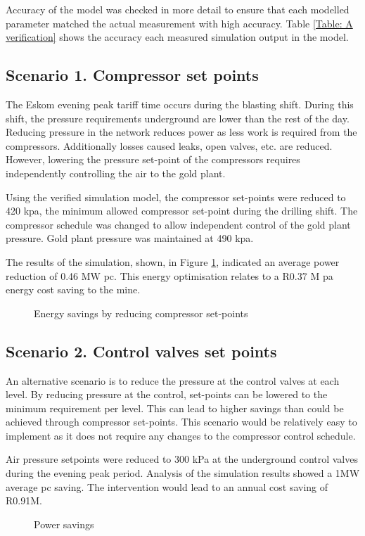 \par
Accuracy of the model was checked in more detail to ensure that each modelled parameter matched the actual measurement with high accuracy. Table \ref{Table: A verification} shows the accuracy each measured simulation output in the model.
\clearpage 
\subsection{Scenario 1. Compressor set points}
The Eskom evening peak tariff time occurs during the blasting shift. During this shift, the pressure requirements underground are lower than the rest of the day. Reducing pressure in the network reduces power as less work is required from the compressors. Additionally losses caused leaks, open valves, etc. are reduced. However, lowering the pressure set-point of the compressors requires independently controlling the air to the gold plant. 
\par 
Using the verified simulation model, the compressor set-points were reduced to 420  \gls{kpa}, the minimum allowed compressor set-point during the drilling shift. The compressor schedule was changed to allow independent control of the gold plant pressure. Gold plant pressure was maintained at 490 \gls{kpa}. \par 
\par 
The results of the simulation, shown, in Figure \ref{fig: CompSetpoints Results Beatrix}, indicated an average power reduction of 0.46 MW \gls{pc}. This energy optimisation relates to a R0.37 M \gls{pa} energy cost saving to the mine. 
\begin{figure}[h!]
	\centering
	
	\caption{Energy savings by reducing compressor set-points}
	\label{fig: CompSetpoints Results Beatrix}
\end{figure}

\subsection{Scenario 2. Control valves set points}
An alternative scenario is to reduce the pressure at the control valves at each level. By reducing pressure at the control, set-points can be lowered to the minimum requirement per level. This can lead to higher savings than could be achieved through compressor set-points. This scenario would be relatively easy to implement as it does not require any changes to the compressor control schedule.
\par 
Air pressure setpoints were reduced to 300 kPa at  the underground control valves during the evening peak period. Analysis of the simulation results showed a  1MW average \gls{pc} saving. The intervention would lead to an annual cost saving of R0.91M.
\begin{figure}[h]
	\centering
	
	\caption{Power savings}
	\label{fig: Control Valve Results Beatrix}
\end{figure}

